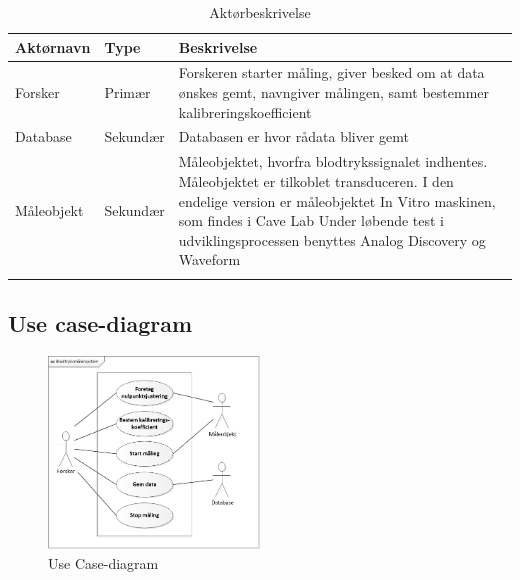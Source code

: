 \begin{table}[H]
\begin{tabularx}{\textwidth}{l l X}
     Aktørnavn	&	Type		&	Beskrivelse \\ \midrule
     Forsker   	& 	Primær  	& 	Forskeren starter måling, giver besked om at data ønskes gemt, navngiver målingen, samt bestemmer kalibreringskoefficient  \\ 			  \addlinespace[2mm]
     Database	&	Sekundær	&	Databasen er hvor rådata bliver gemt \\   \addlinespace[2mm]
     Måleobjekt	&	Sekundær	&	Måleobjektet, hvorfra blodtrykssignalet indhentes. Måleobjektet er tilkoblet transduceren.
     I den endelige version er måleobjektet In Vitro maskinen, som findes i Cave Lab
     Under løbende test i udviklingsprocessen benyttes Analog Discovery og Waveform \\   \addlinespace[2mm]
     
   
     \bottomrule                                                                                                                   
    \end{tabularx}
    \caption {Aktørbeskrivelse}
    \label{tab:aktoerbeskrivelse}
	
\end{table}

\subsection{Use case-diagram}

\begin{figure}[H]
	\centering
	\includegraphics[width=0.5\textwidth]{Figurer/UseCasediagram}
	\caption{Use Case-diagram}
	\label{fig:Use Cases}
\end{figure}

